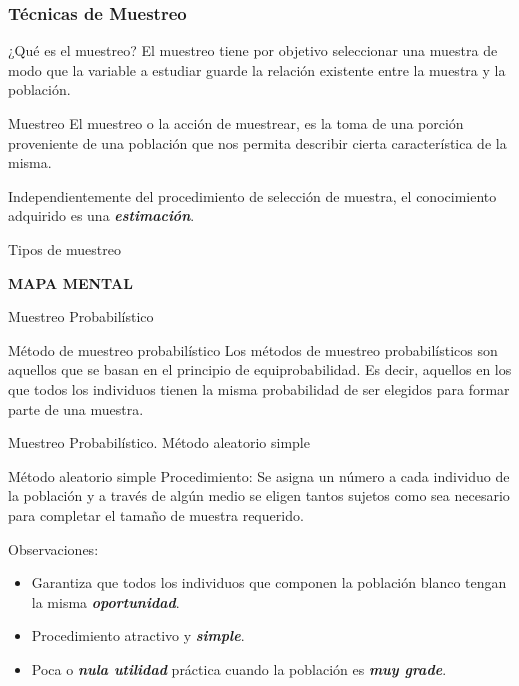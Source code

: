 \documentclass[11pt]{beamer}
\begin{document}
    \subsubsection*{Técnicas de Muestreo}
    \begin{frame}{¿Qué es el muestreo?}
      \pause
      El muestreo tiene por objetivo seleccionar una muestra de modo que la variable a estudiar guarde la relación existente entre la muestra y la población.
      \vspace{0.6cm}
      \pause
      \begin{block}{Muestreo}
        El muestreo o la acción de muestrear, es la toma de una porción proveniente de una población que nos permita describir cierta característica de la misma.
      \end{block}
      \vspace{0.6cm}
      \pause
      Independientemente del procedimiento de selección de muestra, el conocimiento adquirido es una \textit{\textbf{estimación}}.
    \end{frame}

    \begin{frame}{Tipos de muestreo}
      \begin{center}
          \textbf{\huge MAPA MENTAL}
      \end{center}
    \end{frame}

    \begin{frame}{Muestreo Probabilístico}
      \begin{block}{Método de muestreo probabilístico}
        Los métodos de muestreo probabilísticos son aquellos que se basan en el principio de
        equiprobabilidad. Es decir, aquellos en los que todos los individuos tienen la misma probabilidad de ser elegidos para formar parte de una muestra.
      \end{block}
    \end{frame}


    \begin{frame}{Muestreo Probabilístico. Método aleatorio simple}
      \begin{block}{Método aleatorio simple}
        Procedimiento: Se asigna un número a cada individuo de la población y a través de algún medio  se eligen tantos sujetos como sea necesario para completar el tamaño de muestra requerido.
      \end{block}
      \pause
      Observaciones:
      \begin{itemize}
          \item Garantiza que todos los individuos que componen la población blanco tengan la misma \textit{\textbf{oportunidad}}.
          \pause
          \item Procedimiento atractivo y \textit{\textbf{simple}}.
          \pause
          \item Poca o \textit{\textbf{nula utilidad}} práctica cuando la población es \textit{\textbf{muy grade}}.

      \end{itemize}
    \end{frame}
\end{document}
